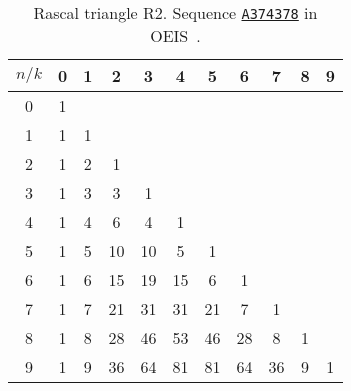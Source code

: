 \begin{table}[H]
    \setlength\extrarowheight{-6pt}
    \begin{tabular}{c|cccccccccc}
        $n/k$ & 0 & 1 & 2  & 3  & 4  & 5  & 6  & 7  & 8 & 9 \\
        \hline
        0     & 1 &   &    &    &    &    &    &    &   &   \\
        1     & 1 & 1 &    &    &    &    &    &    &   &   \\
        2     & 1 & 2 & 1  &    &    &    &    &    &   &   \\
        3     & 1 & 3 & 3  & 1  &    &    &    &    &   &   \\
        4     & 1 & 4 & 6  & 4  & 1  &    &    &    &   &   \\
        5     & 1 & 5 & 10 & 10 & 5  & 1  &    &    &   &   \\
        6     & 1 & 6 & 15 & 19 & 15 & 6  & 1  &    &   &   \\
        7     & 1 & 7 & 21 & 31 & 31 & 21 & 7  & 1  &   &   \\
        8     & 1 & 8 & 28 & 46 & 53 & 46 & 28 & 8  & 1 &   \\
        9     & 1 & 9 & 36 & 64 & 81 & 81 & 64 & 36 & 9 & 1
    \end{tabular}
    \caption{Rascal triangle R2. Sequence \href{https://oeis.org/A374378}{\texttt{A374378}}
    in OEIS~\cite{kolosov2024iterated_R2}.}
    \label{tab:r2-triangle}
\end{table}
